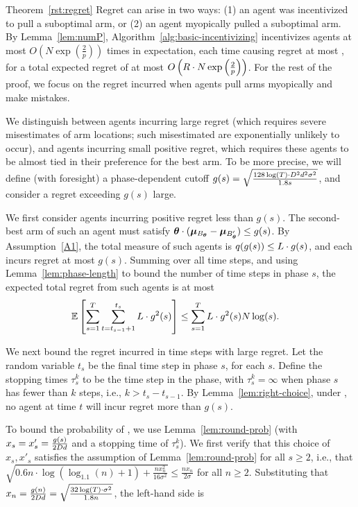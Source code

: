 \begin{extraproof}{Theorem~\ref{rst:regret}}
Regret can arise in two ways:
(1) an agent was incentivized to pull a suboptimal arm, or
(2) an agent myopically pulled a suboptimal arm.
By Lemma~\ref{lem:numP}, Algorithm~\ref{alg:basic-incentivizing}
incentivizes agents at most 
$O\left( N\exp\left(\frac{2}{p}\right) \right)$
times in expectation, each time causing regret at most \MAXR,
for a total expected regret of at most
$O\left(R\cdot N\exp\left(\frac{2}{p}\right) \right)$.
For the rest of the proof, we focus on the regret incurred when agents
pull arms myopically and make mistakes.

We distinguish between agents incurring large regret
(which requires severe misestimates of arm locations;
such misestimated are exponentially unlikely to occur), 
and agents incurring small positive regret,
which requires these agents to be almost tied in their preference for
the best arm.
To be more precise, we will define (with foresight) a phase-dependent
cutoff
$g(s) = \sqrt{\frac{128\log(T) \cdot D^2 d^2 \sigma^2}{1.8 s}}$,
and consider a regret exceeding $g(s)$ large.

We first consider agents \AgV incurring positive regret less than $g(s)$.
The second-best arm \Second{\AgV} of such an agent \AgV must satisfy
$\bm{\theta} \cdot (\bm{\mu}_{B_{\bm{\theta}}} - \bm{\mu}_{B'_{\bm{\theta}}}) \leq g(s)$.
By Assumption~\ref{A1},
the total measure of such agents
is $q(g(s)) \leq L \cdot g(s)$,
and each incurs regret at most $g(s)$.
Summing over all time steps,
and using Lemma~\ref{lem:phase-length} to bound the number of time
steps in phase $s$, 
the expected total regret from such agents is at most
\begin{align}
\Expect{\sum_{s=1}^{T} \sum_{t=t_{s-1}+1}^{t_{s}} \TieDensity \cdot g^2(s)}
& \leq \sum_{s=1}^{T} \TieDensity \cdot g^2(s) \ARMNUM \log(s).
\label{equ:small_regret_bound}
\end{align}

We next bound the regret incurred in time steps with large regret.
Let the random variable $t_s$ be the final time step in phase $s$,
for each $s$. Define the stopping times $\tau_{s}^{k}$ to be the 
time step in the  phase,
with $\tau_{s}^{k} = \infty$ when phase $s$ has fewer than $k$ steps,
i.e., $k > t_{s}-t_{s-1}$.
By Lemma~\ref{lem:right-choice},
under , no agent at time $t$ will incur
regret more than $g(s)$.

To bound the probability of ,
we use Lemma~\ref{lem:round-prob}
(with $x_s = x'_s = \frac{g(s)}{2 D d}$
and a stopping time of $\tau_s^k$).
We first verify that this choice of $x_s, x'_s$
satisfies the assumption of Lemma~\ref{lem:round-prob} for all
$s \geq 2$,
i.e., that
$\sqrt{0.6 n \cdot \log (\log_{1.1}(n) + 1) + \frac{n x_n^2}{16 \sigma^2}}
\leq \frac{n x_n}{2 \sigma}$
for all $n \geq 2$.
Substituting that
$x_n = \frac{g(n)}{2 D d} = \sqrt{\frac{32\log(T) \cdot \sigma^2}{1.8 n}}$,
the left-hand side is


\end{extraproof}

